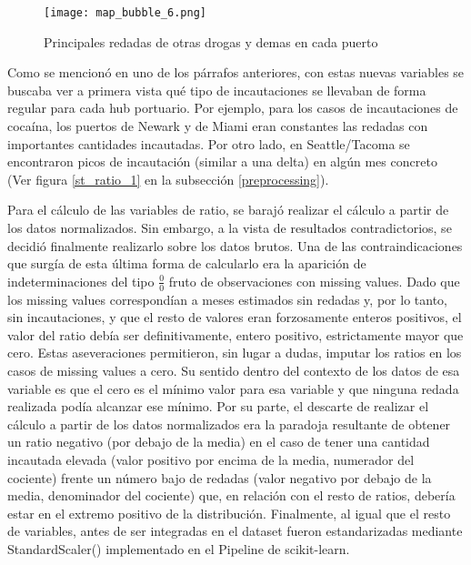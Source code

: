 \documentclass[12pt]{article}
\begin{document}
		\begin{figure}[H]
			\caption{\label{map_bubble_6} Principales redadas de otras drogas y demas en cada puerto}
			\centering
			\hspace*{1cm}
			\texttt{[image: map\_bubble\_6.png]}
		\end{figure}
		
		Como se mencionó en uno de los párrafos anteriores, con estas nuevas variables se buscaba ver a primera vista qué tipo de incautaciones se llevaban de forma regular para cada hub portuario. Por ejemplo, para los casos de incautaciones de cocaína, los puertos de Newark y de Miami eran constantes las redadas con importantes cantidades incautadas. Por otro lado, en Seattle/Tacoma se encontraron picos de incautación (similar a una delta) en algún mes concreto (Ver figura \ref{st_ratio_1} en la subsección \ref{preprocessing}).
		
		Para el cálculo de las variables de ratio, se barajó realizar el cálculo a partir de los datos normalizados. Sin embargo, a la vista de resultados contradictorios, se decidió finalmente realizarlo sobre los datos brutos. Una de las contraindicaciones que surgía de esta última forma de calcularlo era la aparición de indeterminaciones del tipo $ \frac{0}{0}$ fruto de observaciones con missing values. Dado que los missing values correspondían a meses estimados sin redadas y, por lo tanto, sin incautaciones, y que el resto de valores eran forzosamente enteros positivos, el valor del ratio debía ser definitivamente, entero positivo, estrictamente mayor que cero. Estas aseveraciones permitieron, sin lugar a dudas, imputar los ratios en los casos de missing values a cero. Su sentido dentro del contexto de los datos de esa variable es que el cero es el mínimo valor para esa variable y que ninguna redada realizada podía alcanzar ese mínimo. Por su parte, el descarte de realizar el cálculo a partir de los datos normalizados era la paradoja resultante de obtener un ratio negativo (por debajo de la media) en el caso de tener una cantidad incautada elevada (valor positivo por encima de la media, numerador del cociente) frente un número bajo de redadas (valor negativo por debajo de la media, denominador del cociente) que, en relación con el resto de ratios, debería estar en el extremo positivo de la distribución. Finalmente, al igual que el resto de variables, antes de ser integradas en el dataset fueron estandarizadas mediante StandardScaler() implementado en el Pipeline de scikit-learn.
		
\end{document}
